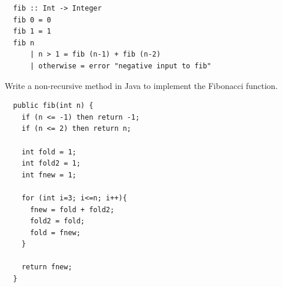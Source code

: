 \documentclass[tikz,border=10pt]{project_plan}
\begin{document}
\begin{lstlisting}
  fib :: Int -> Integer
  fib 0 = 0
  fib 1 = 1
  fib n
      | n > 1 = fib (n-1) + fib (n-2)
      | otherwise = error "negative input to fib"
\end{lstlisting}

Write a non-recursive method in Java to implement the Fibonacci
function.

\begin{lstlisting}
  public fib(int n) {
    if (n <= -1) then return -1;
    if (n <= 2) then return n;

    int fold = 1;
    int fold2 = 1;
    int fnew = 1;

    for (int i=3; i<=n; i++){
      fnew = fold + fold2;
      fold2 = fold;
      fold = fnew;
    }

    return fnew;
  }
\end{lstlisting}
\end{document}
